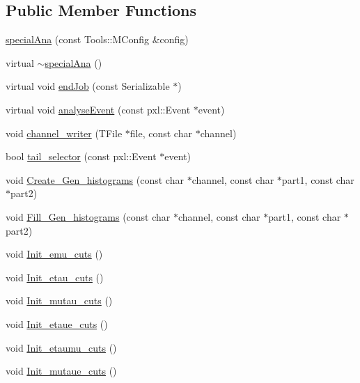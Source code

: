\subsection*{Public Member Functions}
\begin{DoxyCompactItemize}
\item 
\hyperlink{classspecialAna_a709d6c8713ad2e1c14a13e384b14c21c}{special\-Ana} (const Tools\-::\-M\-Config \&config)
\item 
virtual \hyperlink{classspecialAna_aaeb00d6347026bf1ed542741f9b94ba0}{$\sim$special\-Ana} ()
\item 
virtual void \hyperlink{classspecialAna_a37d687c2af0195b3517fef360f98c979}{end\-Job} (const Serializable $\ast$)
\item 
virtual void \hyperlink{classspecialAna_a7de3fd03cce6954d6fdea113eac64799}{analyse\-Event} (const pxl\-::\-Event $\ast$event)
\item 
void \hyperlink{classspecialAna_a6a64568748075d84318c3a94731431b4}{channel\-\_\-writer} (T\-File $\ast$file, const char $\ast$channel)
\item 
bool \hyperlink{classspecialAna_ac1c57a46908e05ba036a0d876a01d805}{tail\-\_\-selector} (const pxl\-::\-Event $\ast$event)
\item 
void \hyperlink{classspecialAna_a67e68ba192d60a50835f0542b828d9ec}{Create\-\_\-\-Gen\-\_\-histograms} (const char $\ast$channel, const char $\ast$part1, const char $\ast$part2)
\item 
void \hyperlink{classspecialAna_ac84e4d445770d092d3eabb1190a7f9bc}{Fill\-\_\-\-Gen\-\_\-histograms} (const char $\ast$channel, const char $\ast$part1, const char $\ast$part2)
\item 
void \hyperlink{classspecialAna_a6e6b80f16fbb84dba1ff7f8245938164}{Init\-\_\-emu\-\_\-cuts} ()
\item 
void \hyperlink{classspecialAna_a6fa51ec65238915bb415ad7f7d63767b}{Init\-\_\-etau\-\_\-cuts} ()
\item 
void \hyperlink{classspecialAna_a7700dad4d41222c7dfb66e34da83ef3e}{Init\-\_\-mutau\-\_\-cuts} ()
\item 
void \hyperlink{classspecialAna_a8e01b23b113658e9c1f978eea69a39ef}{Init\-\_\-etaue\-\_\-cuts} ()
\item 
void \hyperlink{classspecialAna_a5fff5c84a270e73d3883bf1fb0a61b33}{Init\-\_\-etaumu\-\_\-cuts} ()
\item 
void \hyperlink{classspecialAna_ad63394b3c2396acdccadf5eeffa6fa83}{Init\-\_\-mutaue\-\_\-cuts} ()
\item 

\end{DoxyCompactItemize}
